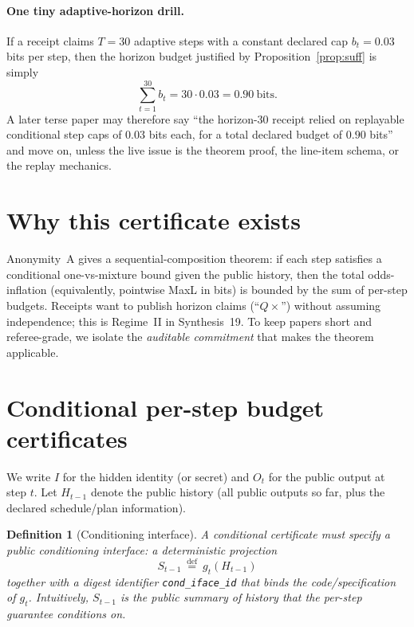 \documentclass[11pt]{article}
\newtheorem{definition}{Definition}
\newcommand{\defeq}{\stackrel{\mathrm{def}}{=}}
\begin{document}
\paragraph{One tiny adaptive-horizon drill.}
If a receipt claims $T=30$ adaptive steps with a constant declared cap $b_t=0.03$ bits per step, then the horizon budget justified by Proposition~\ref{prop:suff} is simply
\[
\sum_{t=1}^{30} b_t = 30\cdot 0.03 = 0.90\ \text{bits}.
\]
A later terse paper may therefore say ``the horizon-30 receipt relied on replayable conditional step caps of $0.03$ bits each, for a total declared budget of $0.90$ bits'' and move on, unless the live issue is the theorem proof, the line-item schema, or the replay mechanics.

\section{Why this certificate exists}
Anonymity~A gives a sequential-composition theorem: if each step satisfies a conditional one-vs-mixture bound given the public history,
then the total odds-inflation (equivalently, pointwise MaxL in bits) is bounded by the sum of per-step budgets.\cite{series:oddsinflation}
Receipts want to publish horizon claims (``$Q\times$'') without assuming independence; this is Regime~II in Synthesis~19.\cite{series:accountingrulebook}
To keep papers short and referee-grade, we isolate the \emph{auditable commitment} that makes the theorem applicable.

\section{Conditional per-step budget certificates}
We write $I$ for the hidden identity (or secret) and $O_t$ for the public output at step $t$.
Let $H_{t-1}$ denote the public history (all public outputs so far, plus the declared schedule/plan information).

\begin{definition}[Conditioning interface]\label{def:conditioning}
A conditional certificate must specify a public \emph{conditioning interface}:
a deterministic projection
\[
S_{t-1}\ \defeq\ g_t(H_{t-1})
\]
together with a digest identifier \texttt{cond\_iface\_id} that binds the code/specification of $g_t$.
Intuitively, $S_{t-1}$ is the public summary of history that the per-step guarantee conditions on.
\end{definition}
\end{document}
